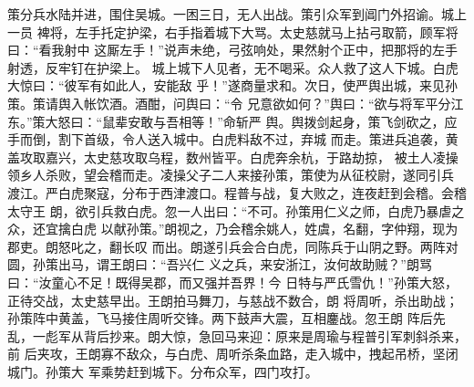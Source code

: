 策分兵水陆并进，围住吴城。一困三日，无人出战。策引众军到阊门外招谕。城上一员
裨将，左手托定护梁，右手指着城下大骂。太史慈就马上拈弓取箭，顾军将曰：“看我射中
这厮左手！”说声未绝，弓弦响处，果然射个正中，把那将的左手射透，反牢钉在护梁上。
城上城下人见者，无不喝采。众人救了这人下城。白虎大惊曰：“彼军有如此人，安能敌
乎！”遂商量求和。次日，使严舆出城，来见孙策。策请舆入帐饮酒。酒酣，问舆曰：“令
兄意欲如何？”舆曰：“欲与将军平分江东。”策大怒曰：“鼠辈安敢与吾相等！”命斩严
舆。舆拨剑起身，策飞剑砍之，应手而倒，割下首级，令人送入城中。白虎料敌不过，弃城
而走。策进兵追袭，黄盖攻取嘉兴，太史慈攻取乌程，数州皆平。白虎奔余杭，于路劫掠，
被土人凌操领乡人杀败，望会稽而走。凌操父子二人来接孙策，策使为从征校尉，遂同引兵
渡江。严白虎聚寇，分布于西津渡口。程普与战，复大败之，连夜赶到会稽。会稽太守王
朗，欲引兵救白虎。忽一人出曰：“不可。孙策用仁义之师，白虎乃暴虐之众，还宜擒白虎
以献孙策。”朗视之，乃会稽余姚人，姓虞，名翻，字仲翔，现为郡吏。朗怒叱之，翻长叹
而出。朗遂引兵会合白虎，同陈兵于山阴之野。两阵对圆，孙策出马，谓王朗曰：“吾兴仁
义之兵，来安浙江，汝何故助贼？”朗骂曰：“汝童心不足！既得吴郡，而又强并吾界！今
日特与严氏雪仇！”孙策大怒，正待交战，太史慈早出。王朗拍马舞刀，与慈战不数合，朗
将周听，杀出助战；孙策阵中黄盖，飞马接住周听交锋。两下鼓声大震，互相鏖战。忽王朗
阵后先乱，一彪军从背后抄来。朗大惊，急回马来迎：原来是周瑜与程普引军刺斜杀来，前
后夹攻，王朗寡不敌众，与白虎、周听杀条血路，走入城中，拽起吊桥，坚闭城门。孙策大
军乘势赶到城下。分布众军，四门攻打。

